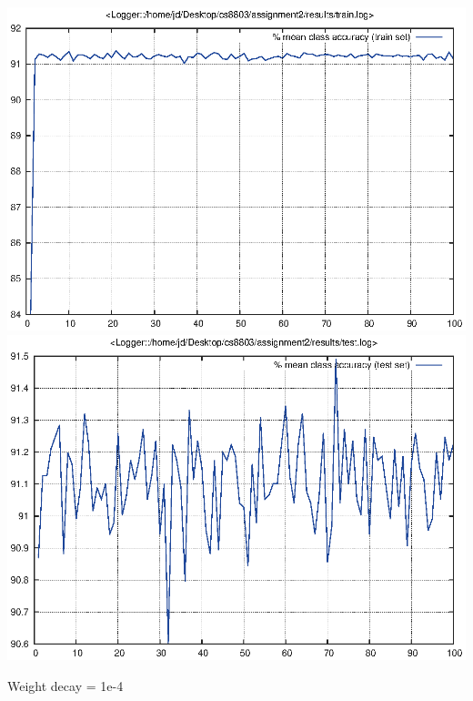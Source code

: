 \documentclass[twoside,12pt]{article}
\newcommand{\imsize}{0.5\linewidth}
\begin{document}
\includegraphics[width=\imsize]{assignment2/results/sgdw_w3_train}
\includegraphics[width=\imsize]{assignment2/results/sgdw_w3_test}

Weight decay = 1e-4
\end{document}
